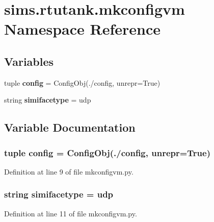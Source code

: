 \section{sims.\+rtutank.\+mkconfigvm Namespace Reference}
\label{namespacesims_1_1rtutank_1_1mkconfigvm}
\subsection*{Variables}
\begin{DoxyCompactItemize}
\item 
tuple {\bf config} = Config\+Obj(\textquotesingle{}./config\textquotesingle{}, unrepr=True)
\item 
string {\bf simifacetype} = \textquotesingle{}udp\textquotesingle{}
\end{DoxyCompactItemize}


\subsection{Variable Documentation}
\subsubsection[{config}]{\setlength{\rightskip}{0pt plus 5cm}tuple config = Config\+Obj(\textquotesingle{}./config\textquotesingle{}, unrepr=True)}\label{namespacesims_1_1rtutank_1_1mkconfigvm_ad5f91786d7c873886a576621a2c1b0b5}


Definition at line 9 of file mkconfigvm.\+py.

\subsubsection[{simifacetype}]{\setlength{\rightskip}{0pt plus 5cm}string simifacetype = \textquotesingle{}udp\textquotesingle{}}\label{namespacesims_1_1rtutank_1_1mkconfigvm_a7f5f5e89422cd15dfc1af6d7593d69c7}


Definition at line 11 of file mkconfigvm.\+py.

